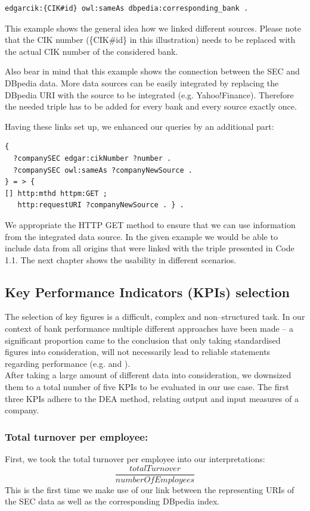 \documentclass[runningheads]{llncs}
\begin{document}
\begin{lstlisting}[caption= Linking resources using the owl:sameAs property]
edgarcik:{CIK#id} owl:sameAs dbpedia:corresponding_bank .
\end{lstlisting}

This example shows the general idea how we linked different sources. Please note that the CIK number (\{CIK\#id\} in this illustration) needs to be replaced with the actual CIK number of the considered bank.

Also bear in mind that this example shows the connection between the SEC and DBpedia data. More data sources can be easily integrated by replacing the DBpedia URI with the source to be integrated (e.g. Yahoo!Finance). Therefore the needed triple has to be added for every bank and every source exactly once.

Having these links set up, we enhanced our queries by an additional part\footnotemark[6]:
\begin{lstlisting}[caption= Using httpm:GET to access data from different sources]
{
  ?companySEC edgar:cikNumber ?number .
  ?companySEC owl:sameAs ?companyNewSource .
} = > {
[] http:mthd httpm:GET ;
   http:requestURI ?companyNewSource . } .
\end{lstlisting}
We appropriate the HTTP GET method to ensure that we can use information from the integrated data source. In the given example we would be able to include data from all origins that were linked with the triple presented in Code 1.1. The next chapter shows the usability in different scenarios.
\subsection{Key Performance Indicators (KPIs) selection}
\label{3.2}
The selection of key figures is a difficult, complex and non--structured task. In our context of bank performance multiple different approaches have been made \cite{KPDZ06} -- a significant proportion came to the conclusion that only taking standardised figures into consideration, will not necessarily lead to reliable statements regarding performance (e.g. \cite{HaSC97} and \cite{BhSh07}). \\
After taking a large amount of different data into consideration, we downsized them to a total number of five KPIs to be evaluated in our use case.
The first three KPIs adhere to the DEA method, relating output and input measures of a company.

\subsubsection{Total turnover per employee:}
First, we took the total turnover per employee \cite{SeZh99} into our interpretations:
\begin{equation}
\frac{totalTurnover}{numberOfEmployees}
\end{equation}
This is the first time we make use of our link between the representing URIs of the SEC data as well as the corresponding DBpedia index.
\end{document}
